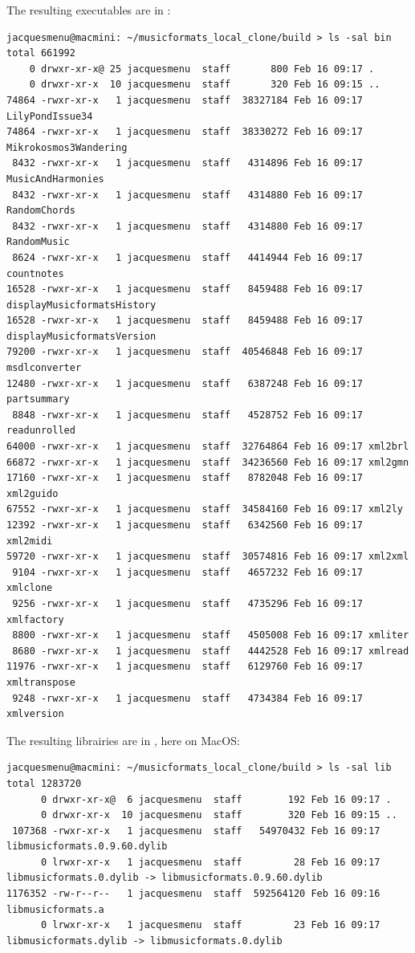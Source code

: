 The resulting executables are in :
\begin{lstlisting}[language=Terminal]
jacquesmenu@macmini: ~/musicformats_local_clone/build > ls -sal bin
total 661992
    0 drwxr-xr-x@ 25 jacquesmenu  staff       800 Feb 16 09:17 .
    0 drwxr-xr-x  10 jacquesmenu  staff       320 Feb 16 09:15 ..
74864 -rwxr-xr-x   1 jacquesmenu  staff  38327184 Feb 16 09:17 LilyPondIssue34
74864 -rwxr-xr-x   1 jacquesmenu  staff  38330272 Feb 16 09:17 Mikrokosmos3Wandering
 8432 -rwxr-xr-x   1 jacquesmenu  staff   4314896 Feb 16 09:17 MusicAndHarmonies
 8432 -rwxr-xr-x   1 jacquesmenu  staff   4314880 Feb 16 09:17 RandomChords
 8432 -rwxr-xr-x   1 jacquesmenu  staff   4314880 Feb 16 09:17 RandomMusic
 8624 -rwxr-xr-x   1 jacquesmenu  staff   4414944 Feb 16 09:17 countnotes
16528 -rwxr-xr-x   1 jacquesmenu  staff   8459488 Feb 16 09:17 displayMusicformatsHistory
16528 -rwxr-xr-x   1 jacquesmenu  staff   8459488 Feb 16 09:17 displayMusicformatsVersion
79200 -rwxr-xr-x   1 jacquesmenu  staff  40546848 Feb 16 09:17 msdlconverter
12480 -rwxr-xr-x   1 jacquesmenu  staff   6387248 Feb 16 09:17 partsummary
 8848 -rwxr-xr-x   1 jacquesmenu  staff   4528752 Feb 16 09:17 readunrolled
64000 -rwxr-xr-x   1 jacquesmenu  staff  32764864 Feb 16 09:17 xml2brl
66872 -rwxr-xr-x   1 jacquesmenu  staff  34236560 Feb 16 09:17 xml2gmn
17160 -rwxr-xr-x   1 jacquesmenu  staff   8782048 Feb 16 09:17 xml2guido
67552 -rwxr-xr-x   1 jacquesmenu  staff  34584160 Feb 16 09:17 xml2ly
12392 -rwxr-xr-x   1 jacquesmenu  staff   6342560 Feb 16 09:17 xml2midi
59720 -rwxr-xr-x   1 jacquesmenu  staff  30574816 Feb 16 09:17 xml2xml
 9104 -rwxr-xr-x   1 jacquesmenu  staff   4657232 Feb 16 09:17 xmlclone
 9256 -rwxr-xr-x   1 jacquesmenu  staff   4735296 Feb 16 09:17 xmlfactory
 8800 -rwxr-xr-x   1 jacquesmenu  staff   4505008 Feb 16 09:17 xmliter
 8680 -rwxr-xr-x   1 jacquesmenu  staff   4442528 Feb 16 09:17 xmlread
11976 -rwxr-xr-x   1 jacquesmenu  staff   6129760 Feb 16 09:17 xmltranspose
 9248 -rwxr-xr-x   1 jacquesmenu  staff   4734384 Feb 16 09:17 xmlversion
\end{lstlisting}

The resulting librairies are in , here on MacOS:
\begin{lstlisting}[language=Terminal]
jacquesmenu@macmini: ~/musicformats_local_clone/build > ls -sal lib
total 1283720
      0 drwxr-xr-x@  6 jacquesmenu  staff        192 Feb 16 09:17 .
      0 drwxr-xr-x  10 jacquesmenu  staff        320 Feb 16 09:15 ..
 107368 -rwxr-xr-x   1 jacquesmenu  staff   54970432 Feb 16 09:17 libmusicformats.0.9.60.dylib
      0 lrwxr-xr-x   1 jacquesmenu  staff         28 Feb 16 09:17 libmusicformats.0.dylib -> libmusicformats.0.9.60.dylib
1176352 -rw-r--r--   1 jacquesmenu  staff  592564120 Feb 16 09:16 libmusicformats.a
      0 lrwxr-xr-x   1 jacquesmenu  staff         23 Feb 16 09:17 libmusicformats.dylib -> libmusicformats.0.dylib
\end{lstlisting}


